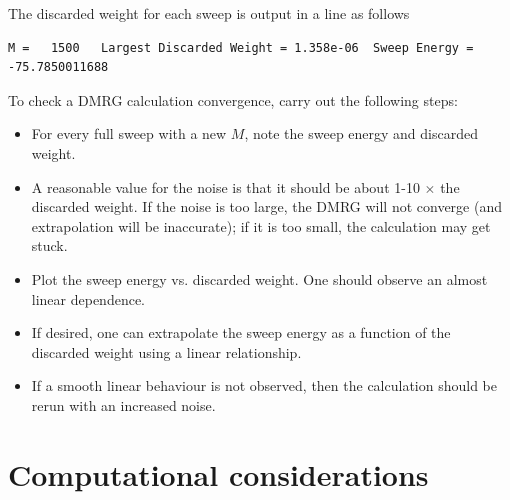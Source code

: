 \documentclass[letterpaper,12pt,aps, pra]{revtex4-1}
\begin{document}
The discarded weight for each sweep is output in a line as follows
\begin{verbatim}
M =   1500   Largest Discarded Weight = 1.358e-06  Sweep Energy =     -75.7850011688
\end{verbatim}

To check a DMRG calculation convergence, carry out the following steps:
\begin{itemize}
\item For every full sweep with a new $M$, note the sweep energy and discarded weight.
\item A reasonable value for the noise is that it should be about 1-10 $\times$ the discarded weight. If the noise
is too large, the DMRG will not converge (and extrapolation will be inaccurate); if it is too small, the calculation
may get stuck.
\item Plot the sweep energy vs. discarded weight. One should observe an almost linear dependence. 
\item If desired, one can extrapolate the sweep energy as a function of the discarded weight using a 
linear relationship. 
\item If a smooth linear behaviour is not observed, then the calculation should be rerun with an increased noise.
\end{itemize}



\section{Computational considerations}\label{sec:computation}
\end{document}
